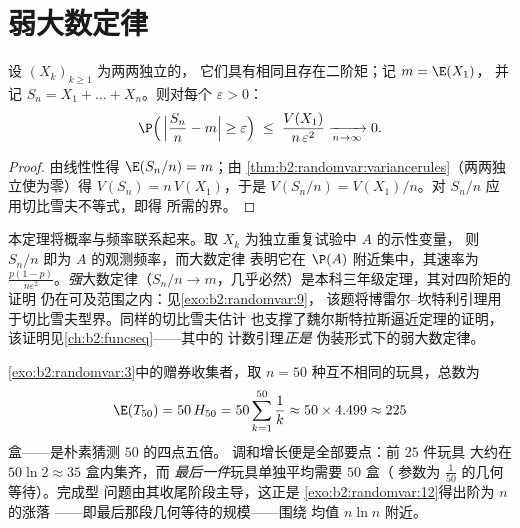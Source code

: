 \section{弱大数定律}

\begin{theorem}[弱大数定律]\label{thm:b2:randomvar:lln}
设 $(X_k)_{k \geq 1}$ 为两两独立的，
它们具有相同且存在二阶矩；记 $m = \E(X_1)$，
并记 $S_n = X_1 + \dots + X_n$。则对每个 $\varepsilon > 0$：
\[
\P\Bigl(\,\Bigl|\frac{S_n}{n} - m\Bigr| \geq \varepsilon\Bigr)
\;\leq\; \frac{V(X_1)}{n\,\varepsilon^2}
\xrightarrow[n \to \infty]{} 0 .
\]
\end{theorem}

\begin{proof}
由线性性得 $\E(S_n/n) = m$；由
\cref{thm:b2:randomvar:variancerules}（两两独立使为零）得
$V(S_n) = n\,V(X_1)$，于是 $V(S_n/n) =
V(X_1)/n$。对 $S_n/n$ 应用切比雪夫不等式，即得
所需的界。
\end{proof}

\begin{remark}
本定理将概率与频率联系起来。取
$X_k$ 为独立重复试验中 $A$ 的示性变量，
则 $S_n/n$ 即为 $A$ 的观测频率，而大数定律
表明它在 $\P(A)$ 附近集中，其速率为
$\frac{p(1-p)}{n\varepsilon^2}$。\emph{强}大数定律（$S_n/n \to
m$，几乎必然）是本科三年级定理，其对四阶矩的证明
仍在可及范围之内：见\cref{exo:b2:randomvar:9}，
该题将博雷尔–坎特利引理用于切比雪夫型界。同样的切比雪夫估计
也支撑了魏尔斯特拉斯逼近定理的证明，
该证明见\cref{ch:b2:funcseq}——其中的
计数引理\emph{正是}
伪装形式下的弱大数定律。
\end{remark}

\begin{example}[收集五十张赠券]
\label{ex:b2:randomvar:couponnumeric}
\cref{exo:b2:randomvar:3}中的赠券收集者，取 $n =
50$ 种互不相同的玩具，总数为
\[
\E(T_{50}) = 50\,H_{50} = 50\sum_{k=1}^{50}\frac1k
\approx 50 \times 4.499 \approx 225
\]
盒——是朴素猜测 $50$ 的四点五倍。
调和增长便是全部要点：前 $25$ 件玩具
大约在 $50\ln2 \approx 35$ 盒内集齐，而
\emph{最后一件}玩具单独平均需要 $50$ 盒（
参数为 $\frac1{50}$ 的几何等待）。完成型
问题由其收尾阶段主导，这正是
\cref{exo:b2:randomvar:12}得出阶为 $n$ 的涨落
——即最后那段几何等待的规模——围绕
均值 $n\ln n$ 附近。
\end{example}

